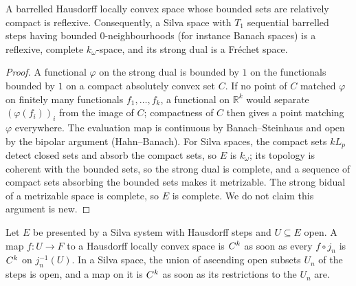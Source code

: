 \begin{theorem}
  \label{thm:ds-silva-duality}
  \leanok
  A barrelled Hausdorff locally convex space whose bounded sets are relatively compact is
  reflexive. Consequently, a Silva space with $T_1$ sequential barrelled steps having bounded
  $0$-neighbourhoods (for instance Banach spaces) is a reflexive, complete $k_\omega$-space, and its
  strong dual is a Fréchet space.
\end{theorem}

\begin{proof}
  \leanok
  A functional $\varphi$ on the strong dual is bounded by $1$ on the functionals bounded by $1$ on
  a compact absolutely convex set $C$. If no point of $C$ matched $\varphi$ on finitely many
  functionals $f_1, \dots, f_k$, a functional on $\mathbb{R}^k$ would separate
  $(\varphi(f_i))_i$ from the image of $C$; compactness of $C$ then gives a point matching
  $\varphi$ everywhere. The evaluation map is continuous by Banach--Steinhaus and open by the
  bipolar argument (Hahn--Banach). For Silva spaces, the compact sets $k L_p$ detect closed sets
  and absorb the compact sets, so $E$ is $k_\omega$; its topology is coherent with the bounded
  sets, so the strong dual is complete, and a sequence of compact sets absorbing the bounded sets
  makes it metrizable. The strong bidual of a metrizable space is complete, so $E$ is complete.
  We do not claim this argument is new.
\end{proof}

\begin{theorem}
  \label{thm:ds-silva-calculus}
  \leanok
  Let $E$ be presented by a Silva system with Hausdorff steps and $U \subseteq E$ open. A map
  $f \colon U \to F$ to a Hausdorff locally convex space is $C^{k}$ as soon as every
  $f \circ j_n$ is $C^{k}$ on $j_n^{-1}(U)$. In a Silva space, the union of ascending open subsets
  $U_n$ of the steps is open, and a map on it is $C^{k}$ as soon as its restrictions to the $U_n$
  are.
\end{theorem}

